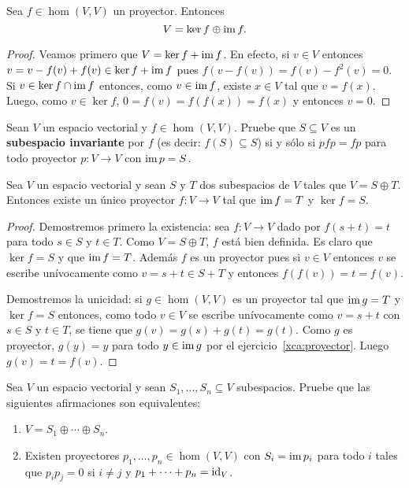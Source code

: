 \begin{prop}
    Sea $f\in\hom(V,V)$ un proyector. Entonces 
    \[
        V=\ker f\oplus \operatorname{im} f.
    \]

    \begin{proof}
        Veamos primero que $V=\ker f+\operatorname{im} f$. En efecto, si $v\in V$ entonces
        $v=v-f(v)+f(v)\in \ker f+\operatorname{im} f$ pues $f(v-f(v))=f(v)-f^2(v)=0$. Si
        $v\in\ker f\cap \operatorname{im} f$ entonces, como $v\in\operatorname{im} f$, existe $x\in V$ tal
        que $v=f(x)$. Luego, como $v\in\ker f$, $0=f(v)=f(f(x))=f(x)$ y
        entonces $v=0$. 
    \end{proof}
\end{prop}

\begin{xca}
	\label{xca:pfp=fp}
	Sean $V$ un espacio vectorial y $f\in\hom(V,V)$. Pruebe que $S\subseteq V$
	es un \textbf{subespacio invariante} por $f$ (es decir: $f(S)\subseteq S$)
	si y sólo si $pfp=fp$ para todo proyector $p\colon V\to V$ con $\operatorname{im} p=S$.
\end{xca}

\begin{prop}
	Sea $V$ un espacio vectorial y sean $S$ y $T$ dos subespacios de $V$ tales que 
	$V=S\oplus T$. Entonces existe un único proyector $f\colon
	V\to V$ tal que $\operatorname{im} f=T$ y $\ker f=S$.

		\begin{proof}
			Demostremos primero la existencia: sea $f\colon V\to V$ dado por
			$f(s+t)=t$ para todo $s\in S$ y $t\in T$.  Como $V=S\oplus T$, $f$
			está bien definida. Es claro que $\ker f=S$ y que $\operatorname{im} f=T$.
			Además $f$ es un proyector pues si $v\in V$ entonces $v$ se escribe
			unívocamente como $v=s+t\in S+T$ y entonces $f(f(v))=t=f(v)$. 

			Demostremos la unicidad: si $g\in\hom(V,V)$ es un proyector tal que
			$\operatorname{im} g=T$ y $\ker f=S$ entonces, como todo $v\in V$ se escribe
			unívocamente como $v=s+t$ con $s\in S$ y $t\in T$, se tiene que
			$g(v)=g(s)+g(t)=g(t)$. Como $g$ es proyector, $g(y)=y$ para todo
			$y\in\operatorname{im} g$ por el ejercicio~\ref{xca:proyector}. Luego
			$g(v)=t=f(v)$. 
		\end{proof}
\end{prop}

\begin{xca}
	\label{xca:oplus_proyectores}
	Sea $V$ un espacio vectorial y sean $S_1,\dots,S_n\subseteq V$ subespacios.
	Pruebe que las siguientes afirmaciones son equivalentes:
	\begin{enumerate}
		\item $V=S_1\oplus\cdots\oplus S_n$.
		\item Existen proyectores $p_1,\dots,p_n\in\hom(V,V)$ con $S_i=\operatorname{im} p_i$
			para todo $i$ tales que $p_ip_j=0$ si $i\ne j$ y
			$p_1+\cdots+p_n=\operatorname{id}_V$.
	\end{enumerate}
\end{xca}

